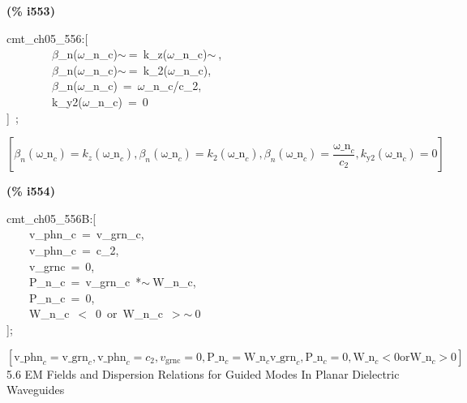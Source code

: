 \documentclass[fleqn]{article}
\begin{document}
\noindent
\begin{minipage}[t]{4.000000em}\color{red}\bfseries
(\% i553)	
\end{minipage}
\begin{minipage}[t]{\textwidth}\color{blue}
cmt\_ch05\_556:[\\
\ \ \ \ \ \ \ \ \ensuremath{\beta}\_n(\ensuremath{\omega}\_n\_c)\ensuremath{\sim\ }=\ k\_z(\ensuremath{\omega}\_n\_c)\ensuremath{\sim\ },\\
\ \ \ \ \ \ \ \ \ensuremath{\beta}\_n(\ensuremath{\omega}\_n\_c)\ensuremath{\sim\ }=\ k\_2(\ensuremath{\omega}\_n\_c),\\
\ \ \ \ \ \ \ \ \ensuremath{\beta}\_n(\ensuremath{\omega}\_n\_c)\ =\ \ensuremath{\omega}\_n\_c/c\_2,\\
\ \ \ \ \ \ \ \ k\_y2(\ensuremath{\omega}\_n\_c)\ =\ 0\\
]\ ;
\end{minipage}
\[\displaystyle \tag{\% o553} 
\operatorname{[}{{\beta }_n}\left( {{\ensuremath{\mathrm{\omega \_ n}}}_c}\right) ={k_z}\left( {{\ensuremath{\mathrm{\omega \_ n}}}_c}\right) \operatorname{,}{{\beta }_n}\left( {{\ensuremath{\mathrm{\omega \_ n}}}_c}\right) ={k_2}\left( {{\ensuremath{\mathrm{\omega \_ n}}}_c}\right) \operatorname{,}{{\beta }_n}\left( {{\ensuremath{\mathrm{\omega \_ n}}}_c}\right) =\frac{{{\ensuremath{\mathrm{\omega \_ n}}}_c}}{{c_2}}\operatorname{,}{k_{\ensuremath{\mathrm{y2}}}}\left( {{\ensuremath{\mathrm{\omega \_ n}}}_c}\right) =0\operatorname{]}\mbox{}
\]


\noindent
\begin{minipage}[t]{4.000000em}\color{red}\bfseries
(\% i554)	
\end{minipage}
\begin{minipage}[t]{\textwidth}\color{blue}
cmt\_ch05\_556B:[\\
\ \ \ \ v\_phn\_c\ =\ v\_grn\_c,\\
\ \ \ \ v\_phn\_c\ =\ c\_2,\\
\ \ \ \ v\_grnc\ =\ 0,\\
\ \ \ \ P\_n\_c\ =\ v\_grn\_c\ *\ensuremath{\sim\ }W\_n\_c,\ \\
\ \ \ \ P\_n\_c\ =\ 0,\\
\ \ \ \ W\_n\_c\ \ensuremath{<}\ 0\ or\ W\_n\_c\ \ensuremath{>}\ensuremath{\sim\ }0\\
];
\end{minipage}
\[\displaystyle \tag{\% o554} 
\operatorname{[}{{\ensuremath{\mathrm{v\_ phn}}}_c}={{\ensuremath{\mathrm{v\_ grn}}}_c}\operatorname{,}{{\ensuremath{\mathrm{v\_ phn}}}_c}={c_2}\operatorname{,}{v_{\ensuremath{\mathrm{grnc}}}}=0\operatorname{,}{{\ensuremath{\mathrm{P\_ n}}}_c}={{\ensuremath{\mathrm{W\_ n}}}_c} {{\ensuremath{\mathrm{v\_ grn}}}_c}\operatorname{,}{{\ensuremath{\mathrm{P\_ n}}}_c}=0\operatorname{,}{{\ensuremath{\mathrm{W\_ n}}}_c}\operatorname{<  }0\ensuremath{\mathrm{ or 
}}{{\ensuremath{\mathrm{W\_ n}}}_c}\operatorname{>  }0\operatorname{]}\mbox{}
\]
5.6 EM Fields and Dispersion Relations for Guided Modes In Planar Dielectric Waveguides
\end{document}
